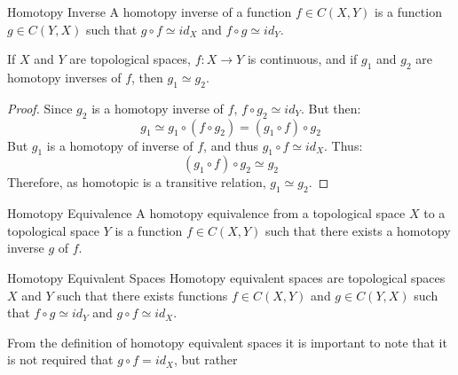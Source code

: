 \documentclass[crop=false,class=book,oneside]{standalone}
\begin{document}
            \begin{ldefinition}{Homotopy Inverse}
                A homotopy inverse of a function $f\in{C}(X,Y)$
                is a function $g\in{C}(Y,X)$ such that
                $g\circ{f}\simeq{id}_{X}$ and $f\circ{g}\simeq{id}_{Y}$.
            \end{ldefinition}
            \begin{theorem}
                If $X$ and $Y$ are topological spaces,
                $f:X\rightarrow{Y}$ is continuous, and if
                $g_{1}$ and $g_{2}$ are homotopy inverses
                of $f$, then $g_{1}\simeq{g}_{2}$.
            \end{theorem}
            \begin{proof}
                Since $g_{2}$ is a homotopy inverse of
                $f$, $f\circ{g}_{2}\simeq{id}_{Y}$. But
                then:
                \begin{equation}
                    g_{1}\simeq{g}_{1}\circ(f\circ{g}_{2})
                    =(g_{1}\circ{f})\circ{g}_{2}
                \end{equation}
                But $g_{1}$ is a homotopy of inverse of $f$,
                and thus $g_{1}\circ{f}\simeq{id}_{X}$. Thus:
                \begin{equation}
                    (g_{1}\circ{f})\circ{g}_{2}
                    \simeq{g}_{2}
                \end{equation}
                Therefore, as homotopic is a transitive relation,
                $g_{1}\simeq{g}_{2}$.
            \end{proof}
            \begin{ldefinition}{Homotopy Equivalence}
                A homotopy equivalence from a topological space
                $X$ to a topological space $Y$ is a function
                $f\in{C}(X,Y)$ such that there exists a
                homotopy inverse $g$ of $f$.
            \end{ldefinition}
            \begin{ldefinition}{Homotopy Equivalent Spaces}
                Homotopy equivalent spaces are topological
                spaces $X$ and $Y$ such that there exists functions
                ${f}\in{C(X,Y)}$ and ${g}\in{C(Y,X)}$
                such that ${f}\circ{g}\simeq{id_{Y}}$
                and ${g}\circ{f}\simeq{id_{X}}$.
            \end{ldefinition}
            From the definition of homotopy equivalent spaces it is important
            to note that it is not required that $g\circ{f}=id_{X}$, but rather
\end{document}
